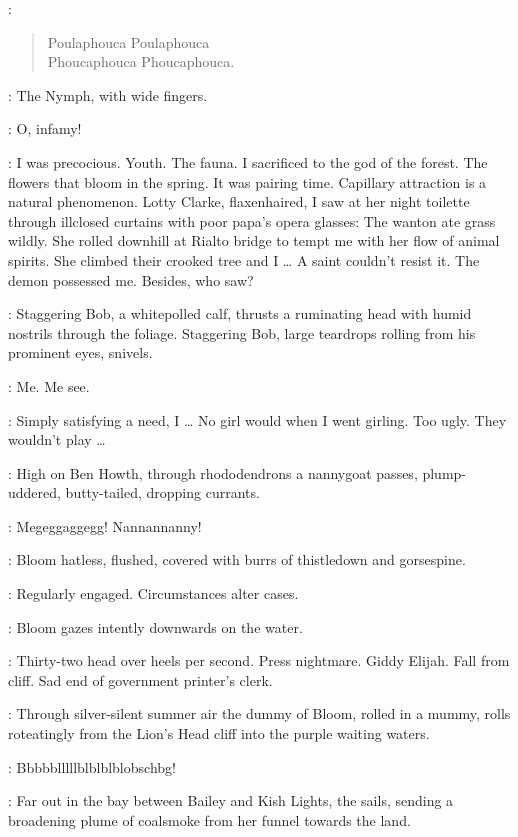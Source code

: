 \Waterfall:
\begin{verse}
    Poulaphouca Poulaphouca\\
    Phoucaphouca Phoucaphouca.
\end{verse}

:
The Nymph, with wide fingers.

\Nymph:
O, infamy!

\Bloom:
I was precocious.
Youth.
The fauna.
I sacrificed to the god of the forest.
The flowers that bloom in the spring.
It was pairing time.
Capillary attraction is a natural phenomenon.
Lotty Clarke, flaxenhaired,
I saw at her night toilette through illclosed curtains
with poor papa's opera glasses:
The wanton ate grass wildly.
She rolled downhill at Rialto bridge
to tempt me with her flow of animal spirits.
She climbed their crooked tree and I \ldots
A saint couldn't resist it.
The demon possessed me.
Besides, who saw?

:
Staggering Bob, a whitepolled calf,
thrusts a ruminating head with humid nostrils through the foliage.
Staggering Bob, large teardrops rolling from his prominent eyes, snivels.

\StaggeringBob:
Me. Me see.

\Bloom:
Simply satisfying a need, I \ldots
{}
No girl would when I went girling.
Too ugly.
They wouldn't play \ldots

:
High on Ben Howth, through rhododendrons a nannygoat passes,
plump-uddered, butty-tailed, dropping currants.

\Nannygoat:
Megeggaggegg!
Nannannanny!

:
Bloom hatless, flushed, covered with burrs of thistledown and gorsespine.

\Bloom:
Regularly engaged.
Circumstances alter cases.

:
Bloom gazes intently downwards on the water.

\Bloom:
Thirty-two head over heels per second.
Press nightmare.
Giddy Elijah.
Fall from cliff.
Sad end of government printer's clerk.

:
Through silver-silent summer air the dummy of Bloom, rolled in a mummy,
rolls roteatingly from the Lion's Head cliff into the purple waiting waters.

\Dummymummy:
Bbbbblllllblblblblobschbg!

:
Far out in the bay between Bailey and Kish Lights,
the  sails,
sending a broadening plume of coalsmoke from her funnel towards the land.

